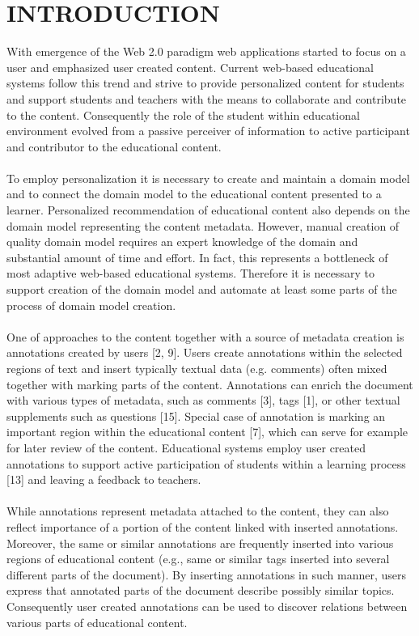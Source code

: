 \documentclass{llncs}
\begin{document}
\section{INTRODUCTION}
%
With emergence of the Web 2.0 paradigm web applications started to focus on a user and emphasized user created content. Current web-based educational systems follow this trend and strive to provide personalized content for students and support students and teachers with the means to collaborate and contribute to the content. Consequently the role of the student within educational environment evolved from a passive perceiver of information to active participant and contributor to the educational content.
\\
\\To employ personalization it is necessary to create and maintain a domain model and to connect the domain model to the educational content presented to a learner. Personalized recommendation of educational content also depends on the domain model representing the content metadata. However, manual creation of quality domain model requires an expert knowledge of the domain and substantial amount of time and effort. In fact, this represents a bottleneck of most adaptive web-based educational systems. Therefore it is necessary to support creation of the domain model and automate at least some parts of the process of domain model creation.\\
\\
One of approaches to the content together with a source of metadata creation is annotations created by users [2, 9]. Users 
create annotations within the selected regions of text and insert typically textual data (e.g. comments) often mixed together with marking parts of the content. Annotations can enrich the document with various types of metadata, such as comments [3], tags [1], or other textual supplements such as questions [15]. Special case of annotation is marking an important region within the educational content [7], which can serve for example for later review of the content. Educational systems employ user created annotations to support active participation of students within a learning process [13] and leaving a feedback to teachers.\\
\\
While annotations represent metadata attached to the content, they can also reflect importance of a portion of the content linked with inserted annotations. Moreover, the same or similar annotations are frequently inserted into various regions of educational content (e.g., same or similar tags inserted into several different parts of the document). By inserting annotations in such manner, users express that annotated parts of the document describe possibly similar topics. Consequently user created annotations can be used to discover relations between various parts of educational content.\\
\end{document}
